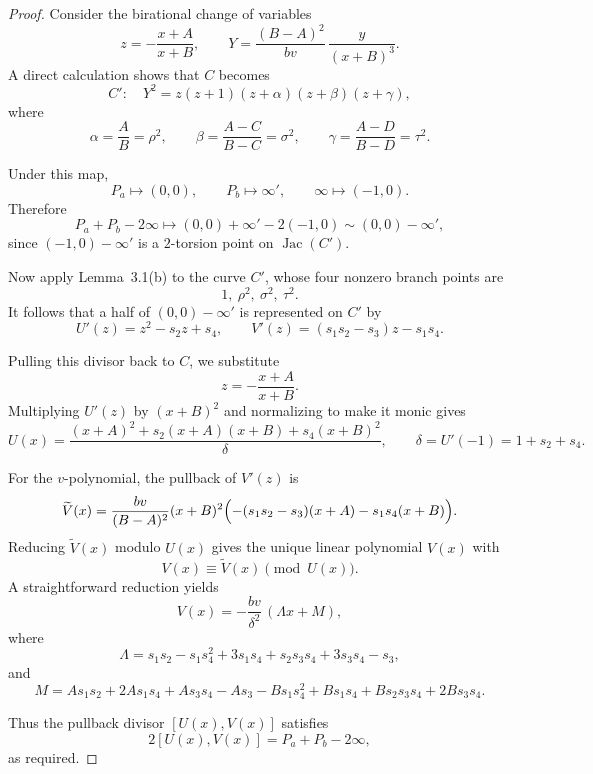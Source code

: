 \documentclass[11pt]{article}
\begin{document}
\begin{proof}
Consider the birational change of variables
\[
z=-\frac{x+A}{x+B},
\qquad
Y=\frac{(B-A)^2}{bv}\,\frac{y}{(x+B)^3}.
\]
A direct calculation shows that $C$ becomes
\[
C':\quad
Y^2=z(z+1)(z+\alpha)(z+\beta)(z+\gamma),
\]
where
\[
\alpha=\frac{A}{B}=\rho^2,\qquad
\beta=\frac{A-C}{B-C}=\sigma^2,\qquad
\gamma=\frac{A-D}{B-D}=\tau^2.
\]

Under this map,
\[
P_a\longmapsto (0,0),\qquad
P_b\longmapsto \infty',\qquad
\infty\longmapsto (-1,0).
\]
Therefore
\[
P_a+P_b-2\infty
\longmapsto
(0,0)+\infty'-2(-1,0)
\sim
(0,0)-\infty',
\]
since $(-1,0)-\infty'$ is a $2$-torsion point on $\operatorname{Jac}(C')$.

Now apply Lemma~3.1(b) to the curve $C'$, whose four nonzero branch points are
\[
1,\ \rho^2,\ \sigma^2,\ \tau^2.
\]
It follows that a half of $(0,0)-\infty'$ is represented on $C'$ by
\[
U'(z)=z^2-s_2z+s_4,
\qquad
V'(z)=(s_1s_2-s_3)z-s_1s_4.
\]

Pulling this divisor back to $C$, we substitute
\[
z=-\frac{x+A}{x+B}.
\]
Multiplying $U'(z)$ by $(x+B)^2$ and normalizing to make it monic gives
\[
U(x)=\frac{(x+A)^2+s_2(x+A)(x+B)+s_4(x+B)^2}{\delta},
\qquad
\delta=U'(-1)=1+s_2+s_4.
\]

For the $v$-polynomial, the pullback of $V'(z)$ is
\[
\widetilde V(x)
=
\frac{bv}{(B-A)^2}(x+B)^2
\Bigl(-(s_1s_2-s_3)(x+A)-s_1s_4(x+B)\Bigr).
\]
Reducing $\widetilde V(x)$ modulo $U(x)$ gives the unique linear polynomial
$V(x)$ with
\[
V(x)\equiv \widetilde V(x)\pmod{U(x)}.
\]
A straightforward reduction yields
\[
V(x)=-\frac{bv}{\delta^2}\,(\Lambda x+M),
\]
where
\[
\Lambda
=
s_1s_2-s_1s_4^2+3s_1s_4+s_2s_3s_4+3s_3s_4-s_3,
\]
and
\[
M
=
As_1s_2+2As_1s_4+As_3s_4-As_3
-Bs_1s_4^2+Bs_1s_4+Bs_2s_3s_4+2Bs_3s_4.
\]

Thus the pullback divisor $[U(x),V(x)]$ satisfies
\[
2[U(x),V(x)]=P_a+P_b-2\infty,
\]
as required.
\end{proof}
\end{document}
